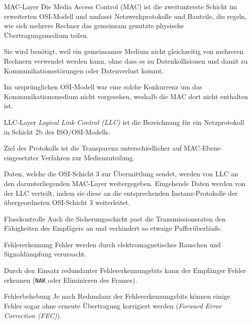 \begin{defi}{MAC-Layer}
    Die Media Access Control (MAC) ist die zweitunterste Schicht im erweiterten OSI-Modell und umfasst Netzwerkprotokolle und Bauteile, die regeln, wie sich mehrere Rechner das gemeinsam genutzte physische Übertragungsmedium teilen.

    Sie wird benötigt, weil ein gemeinsames Medium nicht gleichzeitig von mehreren Rechnern verwendet werden kann, ohne dass es zu Datenkollisionen und damit zu Kommunikationsstörungen oder Datenverlust kommt.

    Im ursprünglichen OSI-Modell war eine solche Konkurrenz um das Kommunikationsmedium nicht vorgesehen, weshalb die MAC dort nicht enthalten ist.
\end{defi}

\begin{defi}{LLC-Layer}
    \emph{Logical Link Control (LLC)} ist die Bezeichnung für ein Netzprotokoll in Schicht 2b des ISO/OSI-Modells.

    Ziel des Protokolls ist die Transparenz unterschiedlicher auf MAC-Ebene eingesetzter Verfahren zur Medienzuteilung.

    Daten, welche die OSI-Schicht 3 zur Übermittlung sendet, werden von LLC an den darunterliegenden MAC-Layer weitergegeben.
    Eingehende Daten werden von der LLC verteilt, indem sie diese an die entsprechenden Instanz-Protokolle der übergeordneten OSI-Schicht 3 weiterleitet.
\end{defi}

\begin{bonus}{Flusskontrolle}
    Auch die Sicherungsschicht past die Transmissionsraten den Fähigkeiten des Empfägers an und verhindert so etwaige Pufferüberläufe.
\end{bonus}

\begin{bonus}{Fehlererkennung}
    Fehler werden durch elektromagnetisches Rauschen und Signaldämpfung verursacht.

    Durch den Einsatz redundanter Fehlererkennungsbits kann der Empfänger Fehler erkennen (\texttt{NAK} oder Eliminieren des Frames).
\end{bonus}

\begin{bonus}{Fehlerbehebung}
    Je nach Redundanz der Fehlererkennungsbits können einige Fehler sogar ohne erneute Übertragung korrigiert werden (\emph{Forward Error Correction (FEC)}).
\end{bonus}